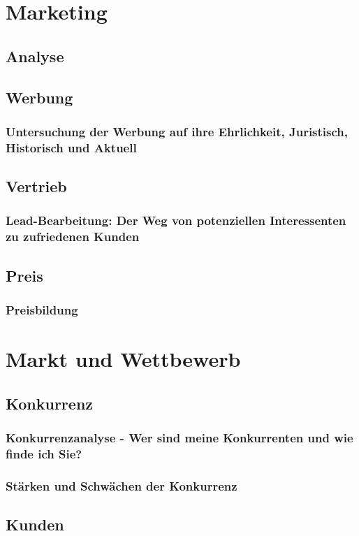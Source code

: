 \chapter{Marketing}
\section{Analyse}
\section{Werbung}
\subsection{Untersuchung der Werbung auf ihre Ehrlichkeit, Juristisch, Historisch und Aktuell}

\section{Vertrieb}
\subsection{Lead-Bearbeitung: Der Weg von potenziellen Interessenten zu zufriedenen Kunden}

\section{Preis}
\subsection{Preisbildung}

\chapter{Markt und Wettbewerb}
\section{Konkurrenz}
\subsection{Konkurrenzanalyse - Wer sind meine Konkurrenten und wie finde ich Sie?}

\subsection{Stärken und Schwächen der Konkurrenz}

\section{Kunden}
